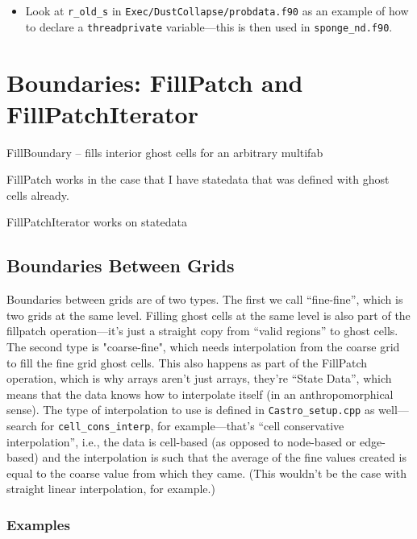 \begin{itemize}
\begin{itemize}
\item Look at {\tt r\_old\_s} in {\tt Exec/DustCollapse/probdata.f90} as an
  example of how to declare a {\tt threadprivate} variable---this is then used
  in {\tt sponge\_nd.f90}.

\end{itemize}

\end{itemize}



\section{Boundaries: FillPatch and FillPatchIterator}

FillBoundary -- fills interior ghost cells for an arbitrary multifab

FillPatch works in the case that I have statedata that was defined
with ghost cells already.

FillPatchIterator works on statedata


\subsection{Boundaries Between Grids}

Boundaries between grids are of two types. The first we call
``fine-fine'', which is two grids at the same level.  Filling ghost
cells at the same level is also part of the fillpatch operation---it's
just a straight copy from ``valid regions'' to ghost cells. The second
type is "coarse-fine", which needs interpolation from the coarse grid
to fill the fine grid ghost cells.  This also happens as part of the
FillPatch operation, which is why arrays aren't just arrays, they're
``State Data'', which means that the data knows how to interpolate
itself (in an anthropomorphical sense).  The type of interpolation to
use is defined in {\tt Castro\_setup.cpp} as well---search for
{\tt cell\_cons\_interp}, for example---that's ``cell conservative
interpolation'', i.e., the data is cell-based (as opposed to node-based
or edge-based) and the interpolation is such that the average of the
fine values created is equal to the coarse value from which they came.
(This wouldn't be the case with straight linear interpolation, for
example.)

\subsubsection{Examples}

